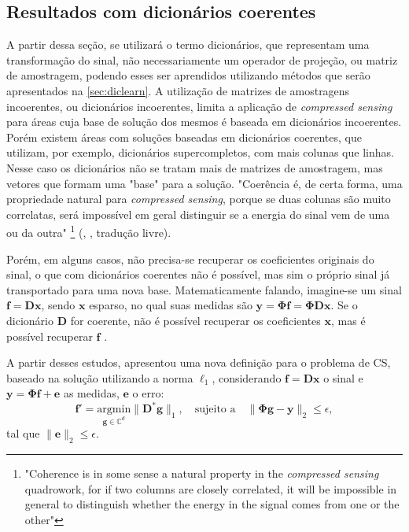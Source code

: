 \documentclass[cic,tc]{iiufrgs}
\renewcommand{\vec}[1]{\bm{#1}}
\begin{document}
\subsection{Resultados com dicionários coerentes}
A partir dessa seção, se utilizará 
o termo dicionários, que representam uma transformação do sinal, 
não necessariamente um operador de projeção, ou matriz de amostragem,
podendo esses ser aprendidos utilizando métodos que serão apresentados na \autoref{sec:diclearn}.
A utilização de matrizes de amostragens incoerentes, ou dicionários incoerentes, 
limita a aplicação de
\emph{compressed sensing} para áreas cuja base de solução dos mesmos é baseada
em dicionários incoerentes.
Porém existem áreas com soluções baseadas em dicionários coerentes, que utilizam, 
por exemplo, dicionários supercompletos, com mais colunas que linhas. 
Nesse caso os dicionários não se tratam mais de matrizes de amostragem,
mas vetores que formam uma "base" para a solução.
"Coerência é, de certa forma, uma propriedade natural para \emph{compressed sensing}, 
porque se duas colunas são muito correlatas, será impossível em geral distinguir se a energia do sinal
vem de uma ou da outra" 
\footnote{"Coherence is in some sense a natural property in the \emph{compressed sensing} quadrowork, for if two
columns are closely correlated, it will be impossible in general to distinguish whether the energy in 
the signal comes from one or the other"}
(\citeauthor{CANDESDICTS}, \citeyear{CANDESDICTS}, tradução livre).

Porém, em alguns casos, não precisa-se recuperar os coeficientes originais do sinal, o que com dicionários 
coerentes não é possível, mas sim o próprio sinal já transportado para uma nova base.
Matematicamente falando, imagine-se um sinal $\vec{f} = \mathbf{D}\vec{x}$, sendo $\vec{x}$ esparso,
no qual suas medidas são
$\vec{y} = \mathbf{\Phi}\vec{f} = \mathbf{\Phi}\mathbf{D}\vec{x}$. 
Se o dicionário $\mathbf{D}$ for
coerente, não é possível recuperar os coeficientes $\vec{x}$, mas é possível recuperar $\vec{f}$ \cite{CANDESDICTS}.

A partir desses estudos, \citet{CANDESDICTS} apresentou uma nova definição para o problema de CS, 
baseado na solução utilizando a norma $\ell_1$, considerando $\vec{f} = \mathbf{D}\vec{x}$ o sinal
e $\vec{y} = \mathbf{\Phi}\vec{f} + \vec{e}$ as medidas, $\vec{e}$ o erro:
\begin{equation}
    \label{eq:problemDl1}
    \vec{f'} = \underset{\vec{g} \in \mathbb{C}^d}{\text{argmin}} \lVert \mathbf{D}^*\vec{g} \rVert_1, 
    \hspace{1em} \text{sujeito a} \hspace{1em}
    \lVert \mathbf{\Phi} \vec{g} - \vec{y} \rVert_2 \le \epsilon, 
\end{equation}
tal que $\lVert \vec{e} \rVert_2 \le \epsilon $.
\end{document}
